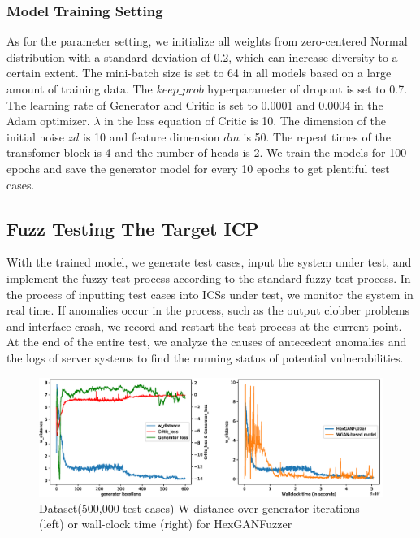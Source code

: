 \subsubsection{Model Training Setting}
As for the parameter setting, we initialize all weights from zero-centered Normal distribution with a standard deviation of 0.2, which can increase diversity to a certain extent. The mini-batch size is set to 64 in all models based on a large amount of training data. The $keep\_prob$ hyperparameter of dropout is set to 0.7. 
The learning rate of Generator and Critic is set to 0.0001 and 0.0004 in the Adam optimizer. 
$\lambda$ in the loss equation of Critic is 10. The dimension of the initial noise $zd$ is 10 and feature dimension $dm$ is 50.
The repeat times of the transfomer block is 4 and the number of heads is 2.
We train the models for 100 epochs and save the generator model for every 10 epochs to get plentiful test cases.


\subsection{Fuzz Testing The Target ICP}
With the trained model, we generate test cases, input the system under test, and implement the fuzzy test process according to the standard fuzzy test process. In the process of inputting test cases into ICSs under test, we monitor the system in real time. If anomalies occur in the process, such as the output clobber problems and interface crash, we record and restart the test process at the current point. At the end of the entire test, we analyze the causes of antecedent anomalies and the logs of server systems to find the running status of potential vulnerabilities.

\begin{figure}[htbp] 		 %
	\centering
	\includegraphics[width=6in]{FigModelW-distance.pdf}
	\caption{Dataset(500,000 test cases) W-distance over generator iterations (left) or wall-clock time (right) for HexGANFuzzer}
	\label{FigModelW-distance}
\end{figure} 

